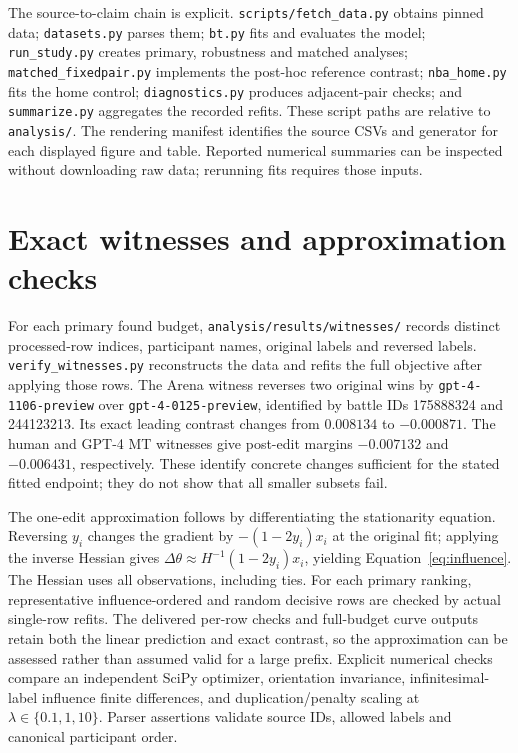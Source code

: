 The source-to-claim chain is explicit. \texttt{scripts/fetch\_data.py} obtains pinned data; \texttt{datasets.py} parses them; \texttt{bt.py} fits and evaluates the model; \texttt{run\_study.py} creates primary, robustness and matched analyses; \texttt{matched\_fixedpair.py} implements the post-hoc reference contrast; \texttt{nba\_home.py} fits the home control; \texttt{diagnostics.py} produces adjacent-pair checks; and \texttt{summarize.py} aggregates the recorded refits. These script paths are relative to \texttt{analysis/}. The rendering manifest identifies the source CSVs and generator for each displayed figure and table. Reported numerical summaries can be inspected without downloading raw data; rerunning fits requires those inputs.

\section{Exact witnesses and approximation checks}
\label{app:witnesses}
For each primary found budget, \texttt{analysis/results/witnesses/} records distinct processed-row indices, participant names, original labels and reversed labels. \texttt{verify\_witnesses.py} reconstructs the data and refits the full objective after applying those rows. The Arena witness reverses two original wins by \texttt{gpt-4-1106-preview} over \texttt{gpt-4-0125-preview}, identified by battle IDs 175888324 and 244123213. Its exact leading contrast changes from $0.008134$ to $-0.000871$. The human and GPT-4 MT witnesses give post-edit margins $-0.007132$ and $-0.006431$, respectively. These identify concrete changes sufficient for the stated fitted endpoint; they do not show that all smaller subsets fail.

The one-edit approximation follows by differentiating the stationarity equation. Reversing $y_i$ changes the gradient by $-(1-2y_i)x_i$ at the original fit; applying the inverse Hessian gives $\Delta\theta\approx H^{-1}(1-2y_i)x_i$, yielding Equation~\ref{eq:influence}. The Hessian uses all observations, including ties. For each primary ranking, representative influence-ordered and random decisive rows are checked by actual single-row refits. The delivered per-row checks and full-budget curve outputs retain both the linear prediction and exact contrast, so the approximation can be assessed rather than assumed valid for a large prefix. Explicit numerical checks compare an independent SciPy optimizer, orientation invariance, infinitesimal-label influence finite differences, and duplication/penalty scaling at $\lambda\in\{0.1,1,10\}$. Parser assertions validate source IDs, allowed labels and canonical participant order.

